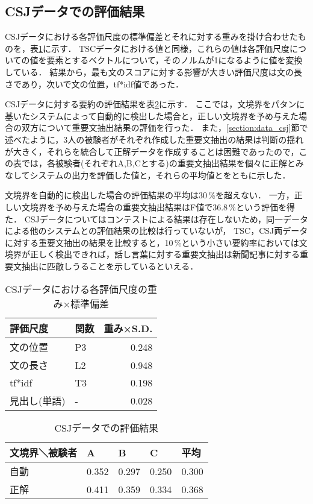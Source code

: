 \subsection{CSJデータでの評価結果}

CSJデータにおける各評価尺度の標準偏差とそれに対する重みを掛け合わせたものを，表\ref{table:optimal_weight_csj}に示す．
TSCデータにおける値と同様，これらの値は各評価尺度についての値を要素とするベクトルについて，そのノルムが1になるように値を変換している．
結果から，最も文のスコアに対する影響が大きい評価尺度は文の長さであり，次いで文の位置，tf*idf値であった．

CSJデータに対する要約の評価結果を表\ref{table:performance_csj}に示す．
ここでは，文境界をパタンに基いたシステムによって自動的に検出した場合と，正しい文境界を予め与えた場合の双方について重要文抽出結果の評価を行った．
また，\ref{section:data_csj}節で述べたように，3人の被験者がそれぞれ作成した重要文抽出の結果は判断の揺れが大きく，それらを統合して正解データを作成することは困難であったので，この表では，各被験者(それぞれA,B,Cとする)の重要文抽出結果を個々に正解とみなしてシステムの出力を評価した値と，それらの平均値とをともに示した．

文境界を自動的に検出した場合の評価結果の平均は30\,\%を超えない．
一方，正しい文境界を予め与えた場合の重要文抽出結果はF値で36.8\,\%という評価を得た．
CSJデータについてはコンテストによる結果は存在しないため，同一データによる他のシステムとの評価結果の比較は行っていないが，
TSC，CSJ両データに対する重要文抽出の結果を比較すると，10\,\%という小さい要約率においては文境界が正しく検出できれば，話し言葉に対する重要文抽出は新聞記事に対する重要文抽出に匹敵しうることを示しているといえる．

\begin{table}[t]
\caption{CSJデータにおける各評価尺度の重み×標準偏差}
\label{table:optimal_weight_csj}
\begin{center}
\begin{tabular}{l|l|r} \hline 
評価尺度     &  関数 & 重み×S.D. \\ \hline
文の位置     &  P3   & 0.248  \\ 
文の長さ     &  L2   & 0.948  \\ 
tf*idf       &  T3   & 0.198  \\
見出し(単語) &  -    & 0.028  \\ \hline
\end{tabular}
\end{center}
\end{table}

\begin{table}[t]
\caption{CSJデータでの評価結果}
\label{table:performance_csj}
\begin{center}
\begin{tabular}{l|llll} \hline
文境界＼被験者 & A   &   B  &     C &  平均 \\ \hline
自動           & 0.352 & 0.297 & 0.250 & 0.300 \\
正解           & 0.411 & 0.359 & 0.334 & 0.368 \\ \hline
\end{tabular} 
\end{center}
\end{table}

